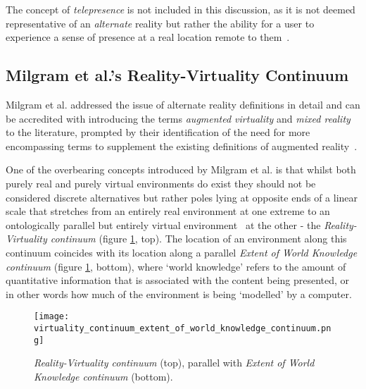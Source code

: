 The concept of \textit{telepresence} is not included in this discussion, as it is not deemed representative of an \textit{alternate} reality but rather the ability for a user to experience a sense of presence at a real location remote to them~\cite{Sheridan1992a}.


\subsection{Milgram et al.'s Reality-Virtuality Continuum}
\label{milgram&kishino}
Milgram et al. addressed the issue of alternate reality definitions in detail and can be accredited with introducing the terms \textit{augmented virtuality} and \textit{mixed reality} to the literature, prompted by their identification of the need for more encompassing terms to supplement the existing definitions of augmented reality~\cite{Milgram1994, Milgram1999}.


One of the overbearing concepts introduced by Milgram et al. is that whilst both purely real and purely virtual environments do exist they should not be considered discrete alternatives but rather poles lying at opposite ends of a linear scale that stretches from an entirely real environment at one extreme to an ontologically parallel but entirely virtual environment~\cite{Qvortrup2002} at the other - the \textit{Reality-Virtuality continuum} (figure \ref{reality_virtuality_extent_of_world_knowledge_continuum}, top). The location of an environment along this continuum coincides with its location along a parallel \textit{Extent of World Knowledge continuum} (figure \ref{reality_virtuality_extent_of_world_knowledge_continuum}, bottom), where `world knowledge' refers to the amount of quantitative information that is associated with the content being presented, or in other words how much of the environment is being `modelled' by a computer.

\begin{figure}[h]
\centering
\texttt{[image: virtuality\_continuum\_extent\_of\_world\_knowledge\_continuum.png]}
\caption{\textit{Reality-Virtuality continuum} (top), parallel with \textit{Extent of World Knowledge continuum} (bottom).}
\label{reality_virtuality_extent_of_world_knowledge_continuum}
\end{figure}

